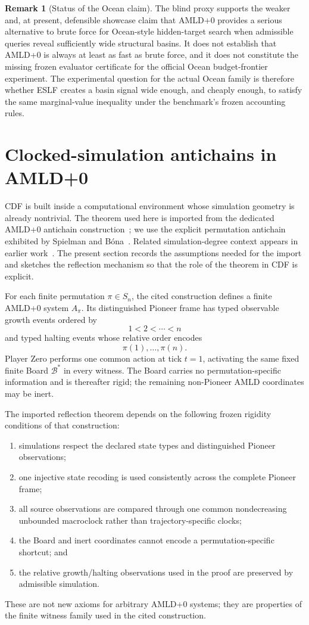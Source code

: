 \documentclass[11pt]{article}
\theoremstyle{definition}
\newtheorem{remark}[theorem]{Remark}
\newcommand{\Board}{\mathcal{B}}
\begin{document}
\begin{remark}[Status of the Ocean claim]
The blind proxy supports the weaker and, at present, defensible showcase claim that AMLD+0 provides a serious alternative to brute force for Ocean-style hidden-target search when admissible queries reveal sufficiently wide structural basins.  It does not establish that AMLD+0 is always at least as fast as brute force, and it does not constitute the missing frozen evaluator certificate for the official Ocean budget-frontier experiment.  The experimental question for the actual Ocean family is therefore whether ESLF creates a basin signal wide enough, and cheaply enough, to satisfy the same marginal-value inequality under the benchmark's frozen accounting rules.
\end{remark}

\section{Clocked-simulation antichains in AMLD+0}

CDF is built inside a computational environment whose simulation geometry is already nontrivial. The theorem used here is imported from the dedicated AMLD+0 antichain construction~\cite{tenneson-antichain}; we use the explicit permutation antichain exhibited by Spielman and B\'ona~\cite{spielmanbona}. Related simulation-degree context appears in earlier work~\cite{tenneson-depths49}. The present section records the assumptions needed for the import and sketches the reflection mechanism so that the role of the theorem in CDF is explicit.

For each finite permutation $\pi\in S_n$, the cited construction defines a finite AMLD+0 system $A_\pi$. Its distinguished Pioneer frame has typed observable growth events ordered by
\[
1<2<\cdots<n
\]
and typed halting events whose relative order encodes
\[
\pi(1),\ldots,\pi(n).
\]
Player Zero performs one common action at tick $t=1$, activating the same fixed finite Board $\Board^*$ in every witness. The Board carries no permutation-specific information and is thereafter rigid; the remaining non-Pioneer AMLD coordinates may be inert.

The imported reflection theorem depends on the following frozen rigidity conditions of that construction:
\begin{enumerate}[label=(\roman*)]
\item simulations respect the declared state types and distinguished Pioneer observations;
\item one injective state recoding is used consistently across the complete Pioneer frame;
\item all source observations are compared through one common nondecreasing unbounded macroclock rather than trajectory-specific clocks;
\item the Board and inert coordinates cannot encode a permutation-specific shortcut; and
\item the relative growth/halting observations used in the proof are preserved by admissible simulation.
\end{enumerate}
These are not new axioms for arbitrary AMLD+0 systems; they are properties of the finite witness family used in the cited construction.
\end{document}
